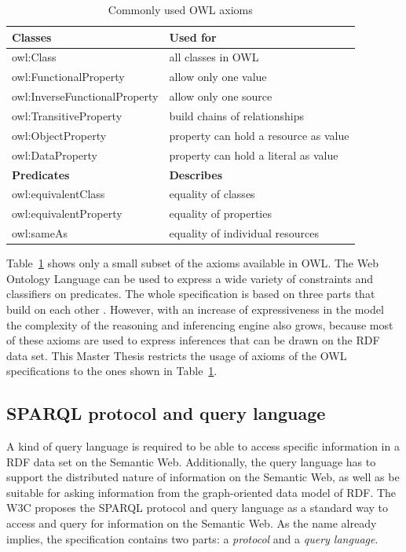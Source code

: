 \begin{table}[H]
\centering
\begin{tabular}{p{5cm}p{7cm}}
\hline
\textbf{Classes} & \textbf{Used for} \\
\hline
owl:Class & all classes in \gls{OWL}  \\
\hline
owl:FunctionalProperty & allow only one value \\
\hline
owl:InverseFunctionalProperty & allow only one source \\
\hline
owl:TransitiveProperty & build chains of relationships \\
\hline
owl:ObjectProperty & property can hold a resource as value \\
\hline
owl:DataProperty & property can hold a literal as value \\
\hline
\textbf{Predicates} & \textbf{Describes} \\
\hline
owl:equivalentClass &	equality of classes \\
\hline
owl:equivalentProperty & equality of properties \\
\hline
owl:sameAs & equality of individual resources \\
\hline
\end{tabular}
\caption[Commonly used \gls{OWL} axioms]{Commonly used \gls{OWL} axioms \citep[pg. 153-185]{allemang2011semantic}}
\label{tab:w3c_vocab_owl}
\end{table}

Table~\ref{tab:w3c_vocab_owl} shows only a small subset of the axioms available in \gls{OWL}. The Web Ontology Language can be used to express a wide variety of constraints and classifiers on predicates. The whole specification is based on three parts that build on each other \citep{owlspec}. However, with an increase of expressiveness in the model the complexity of the reasoning and inferencing engine also grows, because most of these axioms are used to express inferences that can be drawn on the \gls{RDF} data set. This Master Thesis restricts the usage of axioms of the \gls{OWL} specifications to the ones shown in Table~\ref{tab:w3c_vocab_owl}.


\subsection{\gls{SPARQL} protocol and query language}
\label{sec:semantic_querylang}

A kind of query language is required to be able to access specific information in a \gls{RDF} data set on the Semantic Web. Additionally, the query language has to support the distributed nature of information on the Semantic Web, as well as be suitable for asking information from the graph-oriented data model of \gls{RDF}. The \gls{W3C} proposes the \gls{SPARQL} protocol and query language as a standard way to access and query for information on the Semantic Web. As the name already implies, the specification contains two parts: a \emph{protocol} and a \emph{query language}. \\

